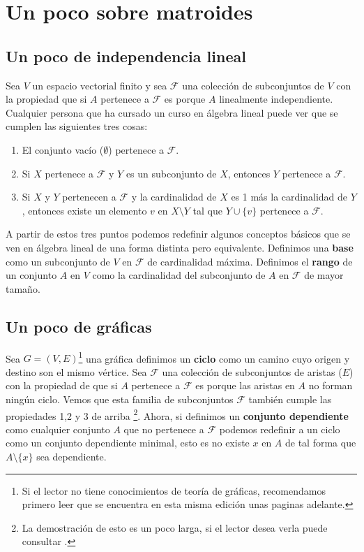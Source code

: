 \chapter{Un poco sobre matroides}

\section{Un poco de independencia lineal}
Sea $V$ un espacio vectorial finito y sea $\mathcal{F}$ una colección de subconjuntos de $V$ con la propiedad que si $A$ pertenece a $\mathcal{F}$ es porque $A$ linealmente independiente. Cualquier persona que ha cursado un curso en álgebra lineal puede ver que se cumplen las siguientes tres cosas: 
    \begin{enumerate}
        \item El conjunto vacío ($\emptyset$) pertenece a $\mathcal{F}$.
        \item Si $X$ pertenece a $\mathcal{F}$ y $Y$ es un subconjunto de $X$, entonces $Y$ pertenece a $\mathcal{F}$.
        \item Si $X$ y $Y$ pertenecen a $\mathcal{F}$ y la cardinalidad de $X$ es 1 más la cardinalidad de $Y$, entonces existe un elemento $v$ en $X \setminus Y$ tal que $Y \cup \{v\} $ pertenece a $\mathcal{F}$. 
    \end{enumerate}
A partir de estos tres puntos podemos redefinir algunos conceptos básicos que se ven en álgebra lineal de una forma distinta pero equivalente. Definimos una \textbf{base} como un subconjunto de $V$ en $\mathcal{F}$ de cardinalidad máxima. Definimos el \textbf{rango} de un conjunto $A$ en $V$ como la cardinalidad del subconjunto de $A$ en $\mathcal{F}$ de mayor tamaño. 

\section*{Un poco de gráficas}
Sea $G = (V,E)$\footnote{Si el lector no tiene conocimientos de teoría de gráficas, recomendamos primero leer \cite{Mariana-Alice} que se encuentra en esta misma edición unas paginas adelante.} una gráfica %
definimos un \textbf{ciclo} como un camino cuyo origen y destino son el mismo vértice. Sea $\mathcal{F}$ una colección de subconjuntos de aristas ($E$) con la propiedad de que si $A$ pertenece a $\mathcal{F}$ es porque las aristas en $A$ no forman ningún ciclo. Vemos que esta familia de subconjuntos $\mathcal{F}$ también cumple las propiedades 1,2 y 3 de arriba \footnote{La demostración de esto es un poco larga, si el lector desea verla puede consultar \cite{ciclos}. }. Ahora, si definimos un \textbf{conjunto dependiente} como cualquier conjunto $A$ que no pertenece a $\mathcal{F}$ podemos redefinir a un ciclo como un conjunto dependiente minimal, esto es %
no existe $x$ en $A$ de tal forma que $A \setminus \{ x \}$ sea dependiente. 

